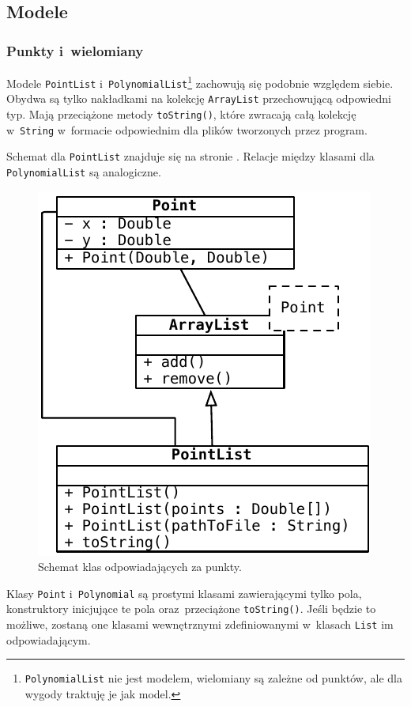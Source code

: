 \documentclass[10pt,a4paper]{article}
\newcommand{\f}[1]{\texttt{#1}}
\begin{document}
\subsection{Modele}

\subsubsection{Punkty i~wielomiany}

Modele \f{PointList} i~\f{PolynomialList}\footnote{\f{PolynomialList} nie jest
modelem, wielomiany są zależne od punktów, ale dla wygody traktuję je jak
model.} zachowują się podobnie względem siebie. Obydwa są tylko nakładkami na
kolekcję \f{ArrayList} przechowującą odpowiedni typ. Mają przeciążone metody
\f{toString()}, które zwracają całą kolekcję w~\f{String} w~formacie
odpowiednim dla plików tworzonych przez program.

Schemat dla \f{PointList} znajduje się na stronie
\pageref{fig:punkty-szczegolowo}. Relacje między klasami dla \f{PolynomialList}
są analogiczne.

\begin{figure}[ht]
  \centering
  \includegraphics{figury/punkty-szczegolowo}
  \caption{Schemat klas odpowiadających za punkty.}
  \label{fig:punkty-szczegolowo}
\end{figure}

Klasy \f{Point} i~\f{Polynomial} są prostymi klasami zawierającymi tylko pola,
konstruktory inicjujące te pola oraz~przeciążone \f{toString()}. Jeśli będzie
to możliwe, zostaną one klasami wewnętrznymi zdefiniowanymi w~klasach \f{List}
im odpowiadającym.
\end{document}
